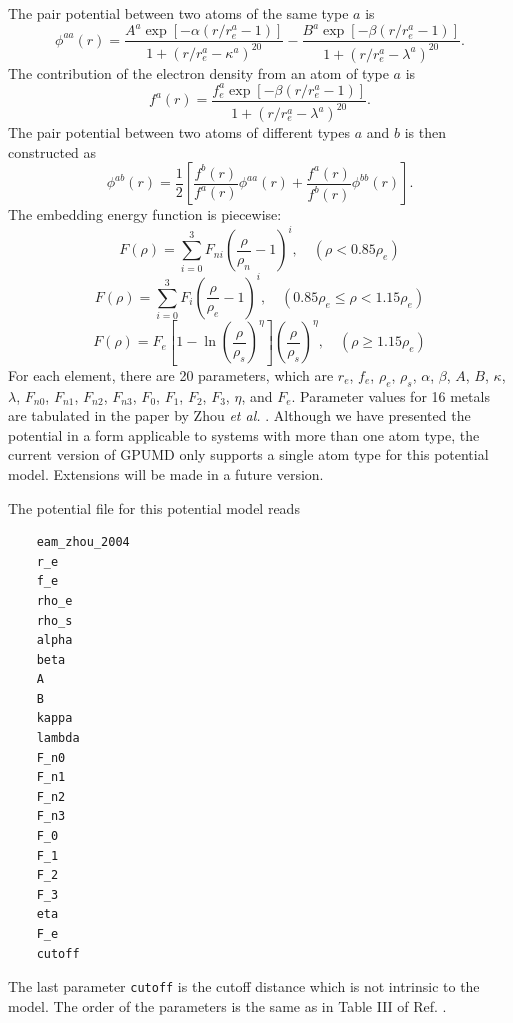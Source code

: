 \documentclass[12pt,a4paper]{report}
\begin{document}
The pair potential between two atoms of the same type $a$ is
\begin{equation}
\phi^{aa}(r) = \frac{ A^a \exp[-\alpha(r/r_e^a-1)] } { 1+(r/r_e^a-\kappa^a)^{20} } -
          \frac{ B^a \exp[-\beta(r/r_e^a-1)] } { 1+(r/r_e^a-\lambda^a)^{20} }.
\end{equation}
The contribution of the electron density from an atom of type $a$ is
\begin{equation}
f^a(r) = \frac{ f_e^a \exp[-\beta(r/r_e^a-1)] } { 1+(r/r_e^a-\lambda^a)^{20} }.
\end{equation}
The pair potential between two atoms of different types $a$ and $b$ is then
constructed as
\begin{equation}
\phi^{ab}(r) = \frac{1}{2}
\left[
\frac{ f^b(r) } { f^a(r) } \phi^{aa}(r) + \frac{ f^a(r) } { f^b(r) } \phi^{bb}(r)
\right].
\end{equation}
The embedding energy function is piecewise:
\begin{equation}
F(\rho) = \sum_{i=0}^3 F_{ni} \left( \frac{\rho}{\rho_n}-1\right)^i, \quad (\rho < 0.85\rho_e)
\end{equation}
\begin{equation}
F(\rho) = \sum_{i=0}^3 F_{i} \left( \frac{\rho}{\rho_e}-1\right)^i, \quad (0.85\rho_e \leq \rho < 1.15\rho_e)
\end{equation}
\begin{equation}
F(\rho) = F_{e} \left[ 1- \ln \left(\frac{\rho}{\rho_s}\right)^{\eta}\right] \left(\frac{\rho}{\rho_s}\right)^{\eta}, \quad (\rho \geq 1.15\rho_e)
\end{equation}
For each element, there are 20 parameters, which are $r_e$, $f_e$, $\rho_e$, $\rho_s$, $\alpha$, $\beta$, $A$, $B$, $\kappa$, $\lambda$, $F_{n0}$, $F_{n1}$, $F_{n2}$, $F_{n3}$, $F_{0}$, $F_{1}$, $F_{2}$, $F_{3}$, $\eta$, and $F_e$. Parameter values for 16 metals are tabulated in the paper by Zhou \textit{et al.} \cite{zhou2004prb}. Although we have presented the potential in a form applicable to systems with more than one atom type, the current version of GPUMD only supports a single atom type for this potential model. Extensions will be made in a future version.

The potential file for this potential model reads
\begin{verbatim}
    eam_zhou_2004
    r_e
    f_e
    rho_e
    rho_s
    alpha
    beta
    A
    B
    kappa
    lambda
    F_n0
    F_n1
    F_n2
    F_n3
    F_0
    F_1
    F_2
    F_3
    eta
    F_e
    cutoff
\end{verbatim}
The last parameter \verb"cutoff" is the cutoff distance which is not intrinsic to the model. The order of the parameters is the same as in Table III of Ref. \cite{zhou2004prb}.
\end{document}
